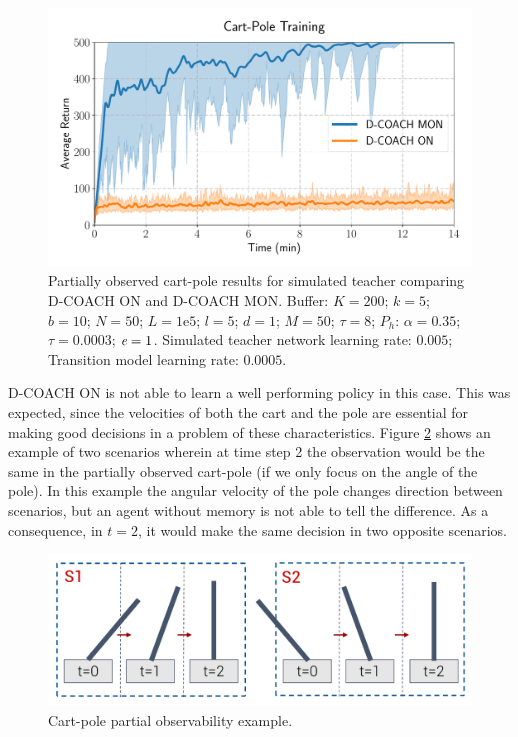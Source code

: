 \begin{figure}[H]
    \centering
    \includegraphics[width=0.7\linewidth]{imagenes/cap3/cartpole_LD_model.pdf}
    \caption[Partially observed Cart-Pole results for simulated teacher comparing D-COACH ON and D-COACH MON.]{Partially observed cart-pole results for simulated teacher comparing D-COACH ON and D-COACH MON.  Buffer: $K = 200$; $k=5$; $b = 10$; $N = 50$; $L=1\mathrm{e}5$; $l=5$; $d=1$; $M=50$; $\tau=8$; $P_{h}$: $\alpha = 0.35$; $\tau = 0.0003$; $\emph{e}=1$. Simulated teacher network learning rate: $0.005$; Transition model learning rate: $0.0005$.}
    \label{fig:ld_cartpole_model}
\end{figure}

D-COACH ON is not able to learn a well performing policy in this case. This was expected, since the velocities of both the cart and the pole are essential for making good decisions in a problem of these characteristics. Figure \ref{fig:cp_ex} shows an example of two scenarios wherein at time step 2 the observation would be the same in the partially observed cart-pole (if we only focus on the angle of the pole). In this example the angular velocity of the pole changes direction between scenarios, but an agent without memory is not able to tell the difference. As a consequence, in $t=2$, it would make the same decision in two opposite scenarios.

\begin{figure}[h]
    \centering
    \includegraphics[width=0.65\linewidth]{imagenes/cap4/cartpole_ex.pdf}
    \caption{Cart-pole partial observability example.}
    \label{fig:cp_ex}
    \vspace{-0.2cm}
\end{figure}

